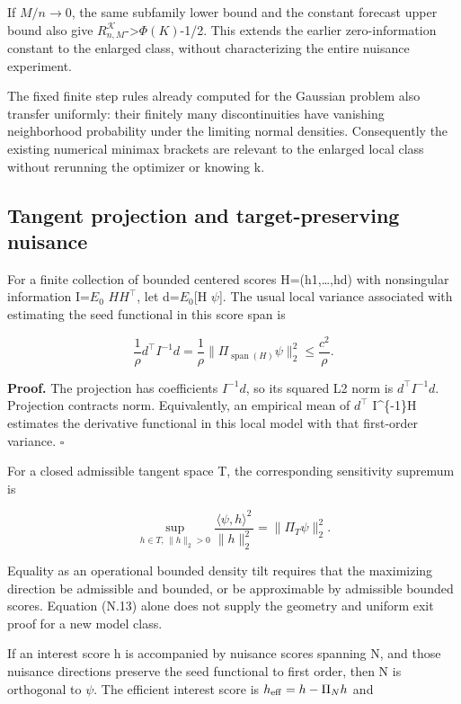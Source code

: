 If \(M/n\to0\), the same subfamily lower bound and the constant forecast upper bound also give \(R^{\mathcal K}_{n,M}\)-\textgreater{}\(\Phi(K)\)-1/2. This extends the earlier zero-information constant to the enlarged class, without characterizing the entire nuisance experiment.

The fixed finite step rules already computed for the Gaussian problem also transfer uniformly: their finitely many discontinuities have vanishing neighborhood probability under the limiting normal densities. Consequently the existing numerical minimax brackets are relevant to the enlarged local class without rerunning the optimizer or knowing k.

\subsection{Tangent projection and target-preserving nuisance}\label{tangent-projection-and-target-preserving-nuisance}

For a finite collection of bounded centered scores H=(h1,\ldots,hd) with nonsingular information I=\(E_0\) \(HH^\top\), let d=\(E_0\){[}H \(\psi\){]}. The usual local variance associated with estimating the seed functional in this score span is

\[
\frac1\rho d^\top I^{-1}d
=\frac1\rho\|\Pi_{\operatorname{span}(H)}\psi\|_2^2
\le\frac{c^2}{\rho}.
\tag{N.12}
\]

\textbf{Proof.} The projection has coefficients \(I^{-1}d\), so its squared L2 norm is \(d^\top I^{-1}d\). Projection contracts norm. Equivalently, an empirical mean of \(d^\top\) I\^{}\{-1\}H estimates the derivative functional in this local model with that first-order variance. \(\square\)

For a closed admissible tangent space T, the corresponding sensitivity supremum is

\[
\sup_{h\in T,\,\|h\|_2>0}
\frac{\langle\psi,h\rangle^2}{\|h\|_2^2}
=\|\Pi_T\psi\|_2^2.
\tag{N.13}
\]

Equality as an operational bounded density tilt requires that the maximizing direction be admissible and bounded, or be approximable by admissible bounded scores. Equation (N.13) alone does not supply the geometry and uniform exit proof for a new model class.

If an interest score h is accompanied by nuisance scores spanning N, and those nuisance directions preserve the seed functional to first order, then N is orthogonal to \(\psi\). The efficient interest score is \(h_{\rm eff}=h-\Pi_Nh\) and

